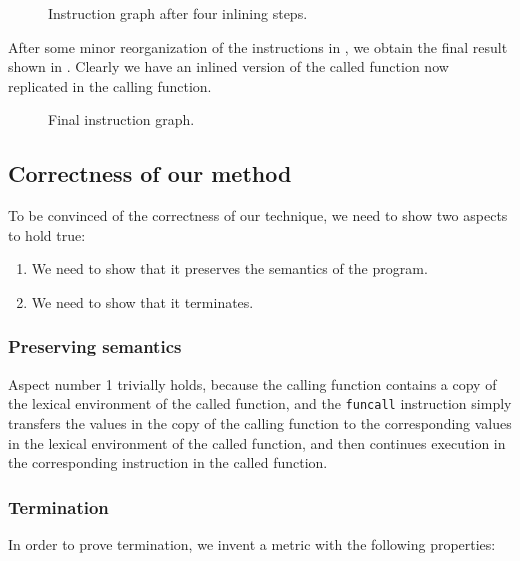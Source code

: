 \begin{figure}
\begin{center}
\end{center}
\caption{\label{fig46}
Instruction graph after four inlining steps.}
\end{figure}

After some minor reorganization of the instructions in ,
we obtain the final result shown in .  Clearly we have an
inlined version of the called function now replicated in the calling
function.

\begin{figure}
\begin{center}
\end{center}
\caption{\label{fig47}
Final instruction graph.}
\end{figure}

\subsection{Correctness of our method}

To be convinced of the correctness of our technique, we need to show
two aspects to hold true:

\begin{enumerate}
\item We need to show that it preserves the semantics of the program.
\item We need to show that it terminates.
\end{enumerate}

\subsubsection{Preserving semantics}

Aspect number 1 trivially holds, because the calling function contains
a copy of the lexical environment of the called function, and the
\texttt{funcall} instruction simply transfers the values in the
copy of the calling function to the corresponding values in the
lexical environment of the called function, and then continues
execution in the corresponding instruction in the called function.

\subsubsection{Termination}

In order to prove termination, we invent a metric with the following
properties:

